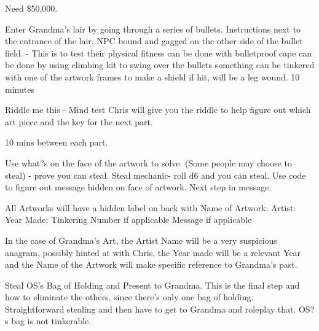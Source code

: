 \documentclass[green]{LRSguildcamp1}
\begin{document}
\name{\gGrandmasChallenge{}}

Need \$50,000.  

Enter Grandma's lair by going through a series of bullets. Instructions next to the entrance of the lair, NPC bound and gagged on the other side of the bullet field.  - This is to test their physical fitness
can be done with bulletproof cape
can be done by using climbing kit to swing over the bullets
something can be tinkered with one of the artwork frames to make a shield
if hit, will be a leg wound. 
10 minutes 
 
Riddle me this - Mind test
Chris will give you the riddle to help figure out which art piece and the key for the next part. 
 
10 mins between each part. 

Use what?s on the face of the artwork to solve. (Some people may choose to steal) - prove you can steal.   Steal mechanic- roll d6 and you can steal. Use code to figure out message hidden on face of artwork. Next step in message.  

All Artworks will have a hidden label on back with 
Name of Artwork: 
Artist: 
Year Made: 
Tinkering Number if applicable
Message if applicable

In the case of Grandma's Art, the Artist Name will be a very suspicious anagram, possibly hinted at with Chris, the Year made will be a relevant Year and the Name of the Artwork will make specific reference to Grandma's past.


Steal OS's Bag of Holding and Present to Grandma. This is the final step and how to eliminate the others, since there's only one bag of holding. Straightforward stealing and then have to get to Grandma and roleplay that. OS?s bag is not tinkerable.  
\end{document}
